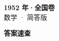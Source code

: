 \documentclass[zihao=-4, a4paper]{ctexart}
\begin{document}
\begin{center}
  {\Large\bfseries 1952 年·全国卷}\\[4pt]
  {\large 数学 · 简答版}
\end{center}
\medskip
{}

\clearpage
{}
\begin{center}{\Large\bfseries 答案速查}\end{center}
\medskip

\end{document}
